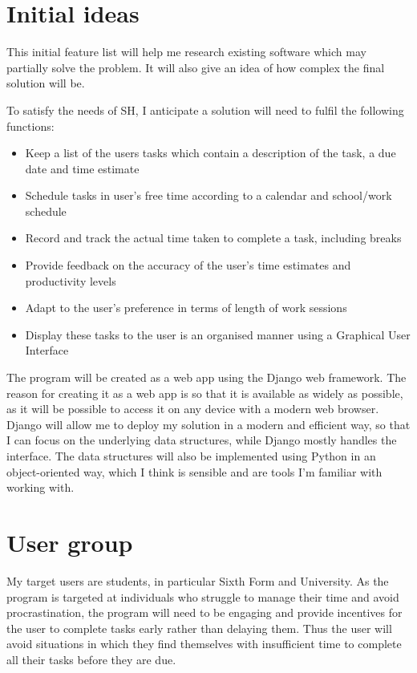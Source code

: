 \documentclass{article}
\begin{document}
\section{Initial ideas}
This initial feature list will help me research existing software which may
partially solve the problem. It will also give an idea of how complex the final
solution will be.

To satisfy the needs of SH, I anticipate a solution will need to fulfil the
following functions:

\begin{itemize}
	\item Keep a list of the users tasks which contain a description of the task, a
	      due date and time estimate
	\item Schedule tasks in user's free time according to a calendar and school/work
	      schedule
	\item Record and track the actual time taken to complete a task, including
	      breaks
	\item Provide feedback on the accuracy of the user's time estimates and
	      productivity levels
	\item Adapt to the user's preference in terms of length of work sessions
	\item Display these tasks to the user is an organised manner using a Graphical
	      User Interface
\end{itemize}

The program will be created as a web app using the Django web framework. The
reason for creating it as a web app is so that it is available as widely as
possible, as it will be possible to access it on any device with a modern web
browser. Django will allow me to deploy my solution in a modern and efficient
way, so that I can focus on the underlying data structures, while Django mostly
handles the interface. The data structures will also be implemented using Python
in an object-oriented way, which I think is sensible and are tools I'm familiar
with working with.

\section{User group}
My target users are students, in particular Sixth Form and University. As the
program is targeted at individuals who struggle to manage their time and avoid
procrastination, the program will need to be engaging and provide incentives for
the user to complete tasks early rather than delaying them. Thus the user will
avoid situations in which they find themselves with insufficient time to
complete all their tasks before they are due.
\end{document}
